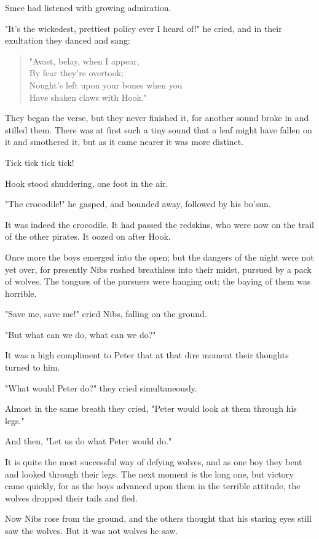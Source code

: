 Smee had listened with growing admiration.

"It's the wickedest, prettiest policy ever I heard of!\@" he cried, and in their exultation they danced and sang:

\begin{verse}
	"Avast, belay, when I appear,\\
	By fear they're overtook;\\
	Nought's left upon your bones when you\\
	Have shaken claws with Hook."
\end{verse}

They began the verse, but they never finished it, for another sound broke in and stilled them.
There was at first such a tiny sound that a leaf might have fallen on it and smothered it, but as it came nearer it was more distinct.

Tick tick tick tick!

Hook stood shuddering, one foot in the air.

"The crocodile!\@" he gasped, and bounded away, followed by his bo'sun.

It was indeed the crocodile.
It had passed the redskins, who were now on the trail of the other pirates.
It oozed on after Hook.

Once more the boys emerged into the open;
but the dangers of the night were not yet over, for presently Nibs rushed breathless into their midst, pursued by a pack of wolves.
The tongues of the pursuers were hanging out;
the baying of them was horrible.

"Save me, save me!\@" cried Nibs, falling on the ground.

"But what can we do, what can we do?"

It was a high compliment to Peter that at that dire moment their thoughts turned to him.

"What would Peter do?\@" they cried simultaneously.

Almost in the same breath they cried, "Peter would look at them through his legs."

And then, "Let us do what Peter would do."

It is quite the most successful way of defying wolves, and as one boy they bent and looked through their legs.
The next moment is the long one, but victory came quickly, for as the boys advanced upon them in the terrible attitude, the wolves dropped their tails and fled.

Now Nibs rose from the ground, and the others thought that his staring eyes still saw the wolves.
But it was not wolves he saw.

